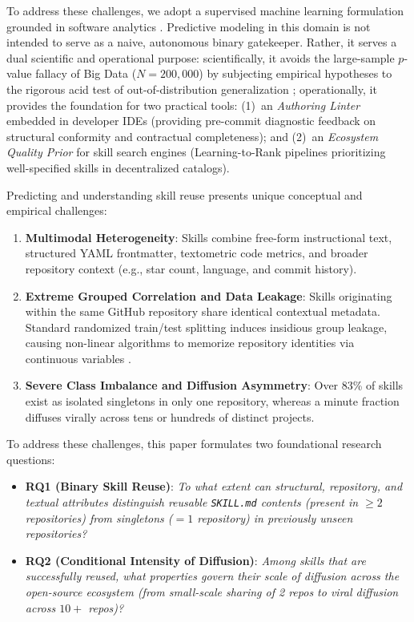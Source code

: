 \documentclass[12pt]{article}
\begin{document}
To address these challenges, we adopt a supervised machine learning formulation grounded in software analytics \cite{menzies2010defect,tantithamthavorn2020code}. Predictive modeling in this domain is not intended to serve as a naive, autonomous binary gatekeeper. Rather, it serves a dual scientific and operational purpose: scientifically, it avoids the large-sample $p$-value fallacy of Big Data ($N=200,000$) \cite{lin2013too} by subjecting empirical hypotheses to the rigorous acid test of out-of-distribution generalization \cite{shmueli2010explain,breiman2001statistical}; operationally, it provides the foundation for two practical tools: (1)~an \emph{Authoring Linter} embedded in developer IDEs (providing pre-commit diagnostic feedback on structural conformity and contractual completeness); and (2)~an \emph{Ecosystem Quality Prior} for skill search engines (Learning-to-Rank pipelines prioritizing well-specified skills in decentralized catalogs).

Predicting and understanding skill reuse presents unique conceptual and empirical challenges:
\begin{enumerate}
    \item \textbf{Multimodal Heterogeneity}: Skills combine free-form instructional text, structured YAML frontmatter, textometric code metrics, and broader repository context (e.g., star count, language, and commit history).
    \item \textbf{Extreme Grouped Correlation and Data Leakage}: Skills originating within the same GitHub repository share identical contextual metadata. Standard randomized train/test splitting induces insidious group leakage, causing non-linear algorithms to memorize repository identities via continuous variables \cite{kaufman2012leakage,saeb2017need}.
    \item \textbf{Severe Class Imbalance and Diffusion Asymmetry}: Over 83\% of skills exist as isolated singletons in only one repository, whereas a minute fraction diffuses virally across tens or hundreds of distinct projects.
\end{enumerate}

To address these challenges, this paper formulates two foundational research questions:
\begin{itemize}
    \item \textbf{RQ1 (Binary Skill Reuse)}: \emph{To what extent can structural, repository, and textual attributes distinguish reusable \texttt{SKILL.md} contents (present in $\ge 2$ repositories) from singletons ($= 1$ repository) in previously unseen repositories?}
    \item \textbf{RQ2 (Conditional Intensity of Diffusion)}: \emph{Among skills that are successfully reused, what properties govern their scale of diffusion across the open-source ecosystem (from small-scale sharing of 2 repos to viral diffusion across $10+$ repos)?}
\end{itemize}
\end{document}
